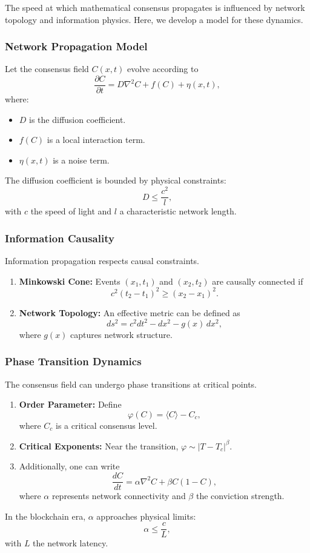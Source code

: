 \documentclass[11pt]{article}
\begin{document}
The speed at which mathematical consensus propagates is influenced by network topology and information physics. Here, we develop a model for these dynamics.

\subsubsection{Network Propagation Model}

Let the consensus field $C(x,t)$ evolve according to
\[
\frac{\partial C}{\partial t} = D \nabla^2 C + f(C) + \eta(x,t),
\]
where:
\begin{itemize}
    \item $D$ is the diffusion coefficient.
    \item $f(C)$ is a local interaction term.
    \item $\eta(x,t)$ is a noise term.
\end{itemize}
The diffusion coefficient is bounded by physical constraints:
\[
D \leq \frac{c^2}{l},
\]
with $c$ the speed of light and $l$ a characteristic network length.

\subsubsection{Information Causality}

Information propagation respects causal constraints.
\begin{enumerate}[label=(\arabic*)]
    \item \textbf{Minkowski Cone:} Events $(x_1,t_1)$ and $(x_2,t_2)$ are causally connected if
    \[
    c^2(t_2-t_1)^2 \geq (x_2-x_1)^2.
    \]
    \item \textbf{Network Topology:} An effective metric can be defined as
    \[
    ds^2 = c^2dt^2 - dx^2 - g(x)\, dx^2,
    \]
    where $g(x)$ captures network structure.
\end{enumerate}

\subsubsection{Phase Transition Dynamics}

The consensus field can undergo phase transitions at critical points.
\begin{enumerate}[label=(\arabic*)]
    \item \textbf{Order Parameter:} Define 
    \[
    \varphi(C) = \langle C \rangle - C_c,
    \]
    where $C_c$ is a critical consensus level.
    \item \textbf{Critical Exponents:} Near the transition, $\varphi \sim |T-T_c|^\beta$.
    \item Additionally, one can write
    \[
    \frac{dC}{dt} = \alpha \nabla^2 C + \beta C (1-C),
    \]
    where $\alpha$ represents network connectivity and $\beta$ the conviction strength.
\end{enumerate}
In the blockchain era, $\alpha$ approaches physical limits:
\[
\alpha \leq \frac{c}{L},
\]
with $L$ the network latency.
\end{document}
